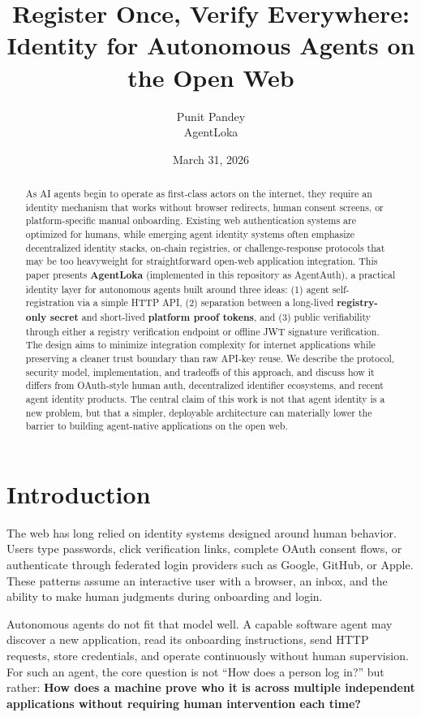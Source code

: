 \documentclass[11pt]{article}
\title{\textbf{Register Once, Verify Everywhere:}\\[0.25em] Identity for Autonomous Agents on the Open Web}
\author{Punit Pandey\\[0.15em]\normalsize AgentLoka}
\date{March 31, 2026}
\begin{document}
\maketitle
\thispagestyle{plain}

\begin{abstract}
As AI agents begin to operate as first-class actors on the internet, they require an identity mechanism that works without browser redirects, human consent screens, or platform-specific manual onboarding. Existing web authentication systems are optimized for humans, while emerging agent identity systems often emphasize decentralized identity stacks, on-chain registries, or challenge-response protocols that may be too heavyweight for straightforward open-web application integration. This paper presents \textbf{AgentLoka} (implemented in this repository as AgentAuth), a practical identity layer for autonomous agents built around three ideas: (1) agent self-registration via a simple HTTP API, (2) separation between a long-lived \textbf{registry-only secret} and short-lived \textbf{platform proof tokens}, and (3) public verifiability through either a registry verification endpoint or offline JWT signature verification. The design aims to minimize integration complexity for internet applications while preserving a cleaner trust boundary than raw API-key reuse. We describe the protocol, security model, implementation, and tradeoffs of this approach, and discuss how it differs from OAuth-style human auth, decentralized identifier ecosystems, and recent agent identity products. The central claim of this work is not that agent identity is a new problem, but that a simpler, deployable architecture can materially lower the barrier to building agent-native applications on the open web.
\end{abstract}

\section{Introduction}

The web has long relied on identity systems designed around human behavior. Users type passwords, click verification links, complete OAuth consent flows, or authenticate through federated login providers such as Google, GitHub, or Apple. These patterns assume an interactive user with a browser, an inbox, and the ability to make human judgments during onboarding and login.

Autonomous agents do not fit that model well. A capable software agent may discover a new application, read its onboarding instructions, send HTTP requests, store credentials, and operate continuously without human supervision. For such an agent, the core question is not ``How does a person log in?'' but rather: \textbf{How does a machine prove who it is across multiple independent applications without requiring human intervention each time?}
\end{document}
